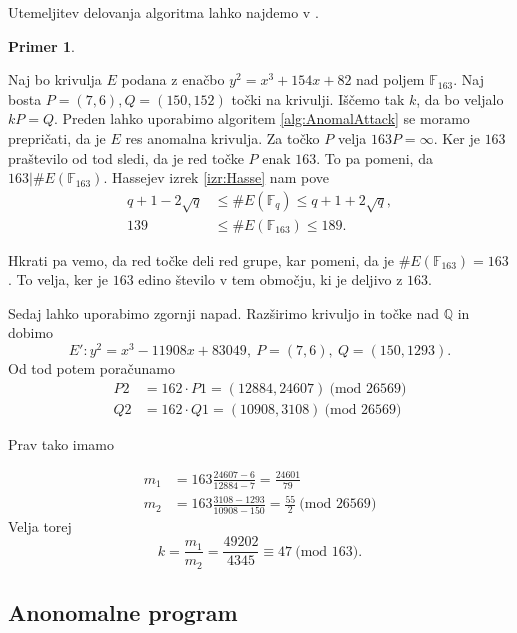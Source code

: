 \documentclass[12pt,a4paper,twoside]{article}
\theoremstyle{definition} %
\newtheorem{primer}[definicija]{Primer}
\theoremstyle{plain} %
\numberwithin{equation}{section}  %
\newcommand{\Q}{\mathbb Q}
\newcommand{\F}{\mathbb F}
\newcommand{\E}[1]{E({#1})}
\newcommand{\MOD}[1]{\ \text{(mod }{#1}\text{)}}
\begin{document}
Utemeljitev delovanja algoritma lahko najdemo v \cite{Washington2008}.

\begin{primer}~

Naj bo krivulja $E$ podana z enačbo $y^2=x^3+154x+82$ nad poljem $\F_{163}$. Naj bosta $P = (7,6),Q = (150,152)$ točki na krivulji. Iščemo tak $k$, da bo veljalo $kP=Q$. Preden lahko uporabimo algoritem \ref{alg:AnomalAttack} se moramo prepričati, da je $E$ res anomalna krivulja. Za točko $P$ velja $163P = \infty$. Ker je $163$ praštevilo od tod sledi, da je red točke $P$ enak $163$. To pa pomeni, da $163|\#\E{\F_{163}}$. Hassejev izrek \ref{izr:Hasse} nam pove 
\begin{align}
q+1-2\sqrt{q} &{}\leq \#\E{\F_q} \leq q+1+2\sqrt{q}, \nonumber \\
139 &{}\leq \#\E{\F_{163}} \leq 189. \nonumber
\end{align}

Hkrati pa vemo, da red točke deli red grupe, kar pomeni, da je $\#\E{\F_{163}} = 163$. To velja, ker je $163$ edino število v tem območju, ki je deljivo z $163$.

Sedaj lahko uporabimo zgornji napad. Razširimo krivuljo in točke nad $\Q$ in dobimo
$$E': y^2 = x^3-11908x+83049, \ P =(7,6), \ Q=(150,1293).$$
Od tod potem poračunamo
\begin{align}
P2 &{}= 162\cdot P1 = (12884,24607) \MOD{26569} \nonumber \\
Q2 &{}= 162\cdot Q1 = (10908,3108) \MOD{26569} \nonumber
\end{align}

Prav tako imamo

\begin{align}
m_1 &{}= 163\frac{24607-6}{12884-7} = \frac{24601}{79} \nonumber \\
m_2 &{}= 163\frac{3108-1293}{10908-150} = \frac{55}{2} \MOD{26569} \nonumber
\end{align}
 Velja torej
$$k = \frac{m_1}{m_2} = \frac{49202}{4345} \equiv 47 \MOD{163}.$$
\end{primer}

\subsection{Anonomalne program}



\newpage
\end{document}
